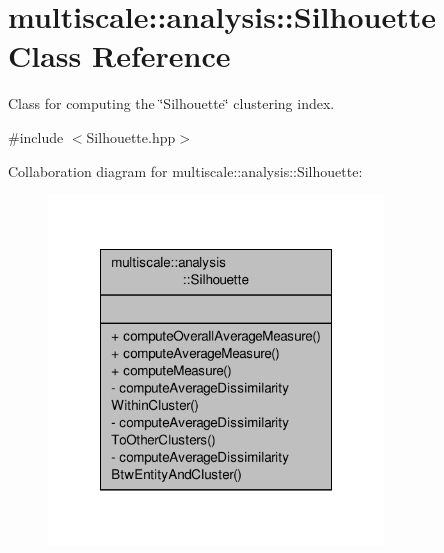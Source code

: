 \hypertarget{classmultiscale_1_1analysis_1_1Silhouette}{\section{multiscale\-:\-:analysis\-:\-:Silhouette Class Reference}
\label{classmultiscale_1_1analysis_1_1Silhouette}
}


Class for computing the \char`\"{}\-Silhouette\char`\"{} clustering index.  




{\ttfamily \#include $<$Silhouette.\-hpp$>$}



Collaboration diagram for multiscale\-:\-:analysis\-:\-:Silhouette\-:
\nopagebreak
\begin{figure}[H]
\begin{center}
\leavevmode
\includegraphics[width=252pt]{classmultiscale_1_1analysis_1_1Silhouette__coll__graph}
\end{center}
\end{figure}
